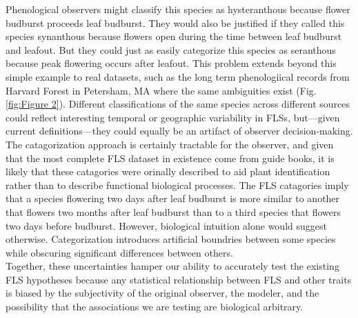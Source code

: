 \documentclass[12pt]{article}
\begin{document}
\noindent Phenological observers might classify this species as hysteranthous because flower budburst proceeds leaf budburst. They would also be justified if they called this species synanthous because flowers open during the time between leaf budburst and leafout. But they could just as easily categorize this species as seranthous because peak flowering occurs after leafout. This problem extends beyond this simple example to real datasets, such as the long term phenologiical records from Harvard Forest in Petersham, MA \citep{OKeefe2015} where the same ambiguities exist (Fig. \ref{fig:Figure 2}). Different classifications of the same species across different sources could reflect interesting temporal or geographic variability in FLSs, but---given current definitions---they could equally be an artifact of observer decision-making.\\

\indent The catagorization approach is certainly tractable for the observer, and given that the most complete FLS dataset in existence come from guide books, it is likely that these catagories were orinally described to aid plant identification rather than to describe functional biological processes. The FLS catagories imply that a species flowering two days after leaf budburst is more similar to another that flowers two months after leaf budburst than to a third species that flowers two days before budburst. However, biological intuition alone would suggest otherwise. %
Categorization introduces artificial boundries between some species while obscuring significant differences between others. \\

\indent Together, these uncertainties hamper our ability to accurately test the existing FLS hypotheses because any statistical relationship between FLS and other traits is biased by the subjectivity of the original observer, the modeler, and the possibility that the associations we are testing are biological arbitrary.\\


\end{document}
